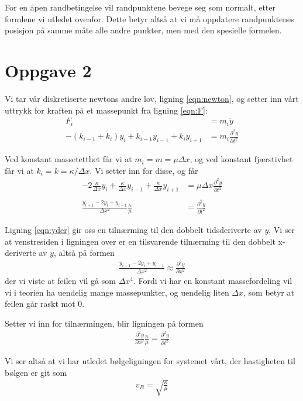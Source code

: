 \documentclass[12p,a4paper]{report}
\begin{document}
For en åpen randbetingelse vil randpunktene bevege seg som normalt, etter formlene vi utledet ovenfor. Dette betyr altså at vi må oppdatere randpunktenes posisjon på samme måte alle andre punkter, men med den spesielle formelen.



\section*{Oppgave 2}
Vi tar vår diskretiserte newtons andre lov, ligning \ref{eqn:newton}, og setter inn vårt uttrykk for kraften på et massepunkt fra ligning \ref{eqn:F}:
\begin{align*}
F_i &= m_i \ddot{y} \\
-(k_{i-1} + k_i)y_i + k_{i-1}y_{i-1} + k_iy_{i+1} &= m_i \frac{\partial^2 y}{\partial t^2}
\end{align*}

Ved konstant massetetthet får vi at $m_i = m = \mu \Delta x$, og ved konstant fjærstivhet får vi at $k_i = k = \kappa/\Delta x$. Vi setter inn for disse, og får
\begin{align*}
-2\frac{\kappa}{\Delta x} y_i + \frac{\kappa}{\Delta x}y_{i-1} + \frac{\kappa}{\Delta x}y_{i+1} &= \mu \Delta x \frac{\partial^2 y}{\partial t^2} \\
\\
\frac{y_{i+1} - 2y_i + y_{i-1}}{\Delta x^2}\frac{\kappa}{\mu} &= \frac{\partial^2 y}{\partial t^2}
\end{align*} 

Ligning \ref{eqn:yder} gir oss en tilnærming til den dobbelt tidsderiverte av $y$. Vi ser at venstresiden i ligningen over er en tilsvarende tilnærming til den dobbelt x-deriverte av $y$, altså på formen
\begin{align*}
\frac{y_{i+1} - 2y_i + y_{i-1}}{\Delta x^2} \approx \frac{\partial^2 y}{\partial x^2}
\end{align*}
der vi viste at feilen vil gå som $\Delta x^4$. Fordi vi har en konstant massefordeling vil vi i teorien ha uendelig mange massepunkter, og uendelig liten $\Delta x$, som betyr at feilen går raskt mot 0.

Setter vi inn for tilnærmingen, blir ligningen på formen
\begin{align*}
\frac{\partial^2 y}{\partial x^2}\frac{\kappa}{\mu} = \frac{\partial^2 y}{\partial t^2}
\end{align*}

Vi ser altså at vi har utledet bølgeligningen for systemet vårt, der hastigheten til bølgen er git som
\begin{align}\label{eqn:vB}
v_B = \sqrt{\frac{\kappa}{\mu}}
\end{align}
\end{document}
